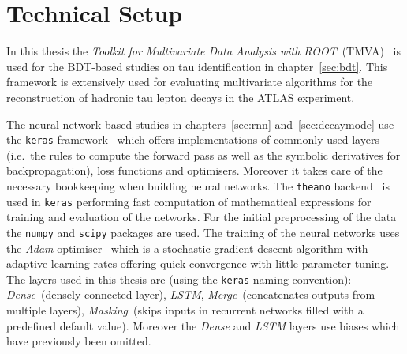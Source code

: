 \section{Technical Setup}
\label{sec:tech_setup}

In this thesis the \emph{Toolkit for Multivariate Data Analysis with
  ROOT}~(TMVA)~\cite{tmva} is used for the BDT-based studies on tau
identification in chapter~\ref{sec:bdt}. This framework is extensively used for
evaluating multivariate algorithms for the reconstruction of hadronic tau lepton
decays in the ATLAS experiment.

The neural network based studies in chapters~\ref{sec:rnn}
and~\ref{sec:decaymode} use the \texttt{keras} framework~\cite{keras} which
offers implementations of commonly used layers (i.e.\ the rules to compute the
forward pass as well as the symbolic derivatives for backpropagation), loss
functions and optimisers. Moreover it takes care of the necessary bookkeeping
when building neural networks. The \texttt{theano} backend~\cite{theano} is used
in \texttt{keras} performing fast computation of mathematical expressions for
training and evaluation of the networks. For the initial preprocessing of the
data the \texttt{numpy} \cite{numpy} and \texttt{scipy} \cite{scipy} packages
are used. The training of the neural networks uses the \emph{Adam}
optimiser~\cite{adam} which is a stochastic gradient descent algorithm with
adaptive learning rates offering quick convergence with little parameter tuning.
The layers used in this thesis are (using the \texttt{keras} naming convention):
\emph{Dense}~(densely-connected layer), \emph{LSTM}, \emph{Merge}~(concatenates
outputs from multiple layers), \emph{Masking}~(skips inputs in recurrent
networks filled with a predefined default value). Moreover the \emph{Dense} and
\emph{LSTM} layers use biases which have previously been omitted.

